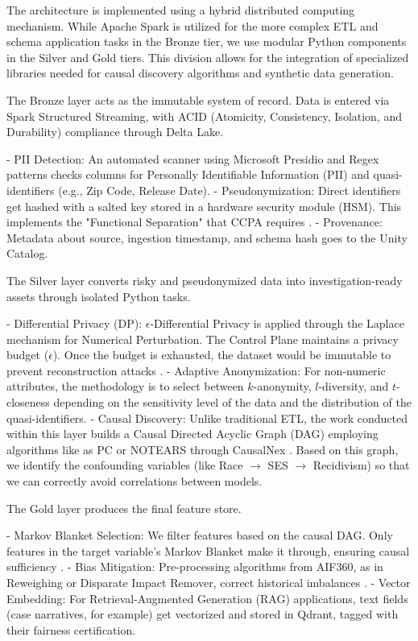 The architecture is implemented using a hybrid distributed computing mechanism. While Apache Spark is utilized for the more complex ETL and schema application tasks in the Bronze tier, we use modular Python components in the Silver and Gold tiers. This division allows for the integration of specialized libraries needed for causal discovery algorithms and synthetic data generation.


The Bronze layer acts as the immutable system of record. Data is entered via Spark Structured Streaming, with ACID (Atomicity, Consistency, Isolation, and Durability) compliance through Delta Lake.

- PII Detection: An automated scanner using Microsoft Presidio and Regex patterns checks columns for Personally Identifiable Information (PII) and quasi-identifiers (e.g., Zip Code, Release Date).
- Pseudonymization: Direct identifiers get hashed with a salted key stored in a hardware security module (HSM). This implements the "Functional Separation" that CCPA requires .
- Provenance: Metadata about source, ingestion timestamp, and schema hash goes to the Unity Catalog.

The Silver layer converts risky and pseudonymized data into investigation-ready assets through isolated Python tasks.

- Differential Privacy (DP): $\epsilon$-Differential Privacy is applied through the Laplace mechanism for Numerical Perturbation. The Control Plane maintains a privacy budget ($\epsilon$). Once the budget is exhausted, the dataset would be immutable to prevent reconstruction attacks .
- Adaptive Anonymization: For non-numeric attributes, the methodology is to select between $k$-anonymity, $l$-diversity, and $t$-closeness depending on the sensitivity level of the data and the distribution of the quasi-identifiers.
- Causal Discovery: Unlike traditional ETL, the work conducted within this layer builds a Causal Directed Acyclic Graph (DAG) employing algorithms like as PC or NOTEARS through CausalNex . Based on this graph, we identify the confounding variables (like Race $\rightarrow$ SES $\rightarrow$ Recidivism) so that we can correctly avoid correlations between models.

The Gold layer produces the final feature store.

- Markov Blanket Selection: We filter features based on the causal DAG. Only features in the target variable's Markov Blanket make it through, ensuring causal sufficiency .
- Bias Mitigation: Pre-processing algorithms from AIF360, as in Reweighing or Disparate Impact Remover, correct historical imbalances .
- Vector Embedding: For Retrieval-Augmented Generation (RAG) applications, text fields (case narratives, for example) get vectorized and stored in Qdrant, tagged with their fairness certification.

